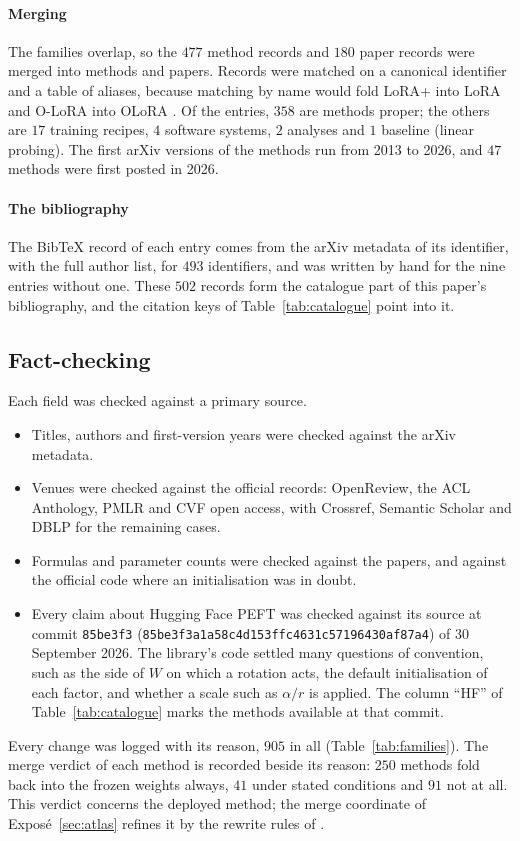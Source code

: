 \paragraph{Merging}
The families overlap, so the $477$ method records and $180$ paper records were merged into \nMethods{} methods and
\nPapers{} papers. Records were matched on a canonical identifier and a table of aliases, because matching by name would
fold LoRA+ \citep{hayou2024lora} into LoRA \citep{hu2021lora} and O-LoRA \citep{wang2023orthogonal} into OLoRA
\citep{buyukakyuz2024olora}. Of the \nMethods{} entries, $358$ are methods proper; the others are $17$ training recipes,
$4$ software systems, $2$ analyses and $1$ baseline (linear probing).
The first arXiv versions of the methods run from 2013 to 2026, and $47$ methods were first posted in 2026.

\paragraph{The bibliography}
The BibTeX record of each entry comes from the arXiv metadata of its identifier, with the full author list, for $493$
identifiers, and was written by hand for the nine entries without one. These $502$ records
form the catalogue part of this paper's bibliography, and the citation keys of Table~\ref{tab:catalogue} point into it.

\subsection{Fact-checking}\label{app:catalogue-verification}

Each field was checked against a primary source.
\begin{itemize}
  \item Titles, authors and first-version years were checked against the arXiv metadata.
  \item Venues were checked against the official records: OpenReview, the ACL Anthology, PMLR and CVF open access, with
  Crossref, Semantic Scholar and DBLP for the remaining cases.
  \item Formulas and parameter counts were checked against the papers, and against the official code where an
  initialisation was in doubt.
  \item Every claim about Hugging Face PEFT \citep{xmangrulkar2022peft} was checked against its source at commit
  \texttt{85be3f3} (\texttt{85be3f3a1a58c4d153ffc4631c57196430af87a4}) of 30 September 2026. The library's code
  settled many questions of convention, such as the side of $W$ on which a rotation acts, the default initialisation of
  each factor, and whether a scale such as $\alpha/r$ is applied. The column ``HF'' of Table~\ref{tab:catalogue} marks
  the \nHF{} methods available at that commit.
\end{itemize}
Every change was logged with its reason, $905$ in all (Table~\ref{tab:families}). The merge verdict of each method is
recorded beside its reason: $250$ methods fold back into the frozen weights always, $41$ under stated conditions and $91$
not at all. This verdict concerns the deployed method; the merge coordinate of Exposé~\ref{sec:atlas} refines it by the
rewrite rules of .

